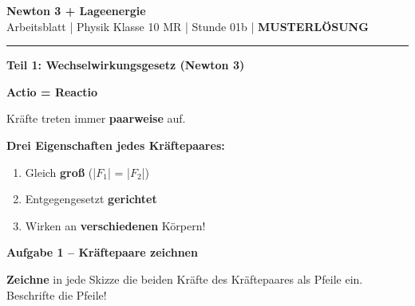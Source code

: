 \documentclass[11pt, a4paper]{article}
\newcommand{\fach}{Physik}
\newcommand{\thema}{Newton 3 + Lageenergie}
\newcommand{\klasse}{10 MR}
\newcommand{\stunde}{01b}
\newcommand{\lsg}[1]{\textcolor{loesung}{\textbf{#1}}}
\newcommand{\aufgabe}[1]{%
    \needspace{4\baselineskip}%
    \vspace{10pt}%
    \noindent\textbf{\textcolor{fachfarbe}{Aufgabe #1}}%
    \vspace{4pt}%
    \nopagebreak[4]%
}
\newcommand{\operator}[1]{\textbf{\textcolor{fachfarbe}{#1}}}
\begin{document}

\begin{center}
    {\Large\bfseries\textcolor{fachfarbe}{\thema}}\\[0.2em]
    {\small Arbeitsblatt | \fach{} Klasse \klasse{} | Stunde \stunde{} | \textcolor{loesung}{\textbf{MUSTERLÖSUNG}}}
\end{center}
\vspace{-0.3em}
\hrule
\vspace{0.6em}


\textbf{\large Teil 1: Wechselwirkungsgesetz (Newton 3)}

\begin{merkkasten}[title={\textbf{Kasten 1: Wechselwirkungsgesetz}}]
\textbf{Actio = Reactio}

Kräfte treten immer \lsg{paarweise} auf.

\vspace{6pt}
\textbf{Drei Eigenschaften jedes Kräftepaares:}
\begin{enumerate}[leftmargin=2em, itemsep=2pt]
    \item Gleich \lsg{groß} (|$F_1$| = |$F_2$|)
    \item Entgegengesetzt \lsg{gerichtet}
    \item Wirken an \lsg{verschiedenen} Körpern!
\end{enumerate}
\end{merkkasten}

\aufgabe{1 – Kräftepaare zeichnen}

\operator{Zeichne} in jede Skizze die beiden Kräfte des Kräftepaares als Pfeile ein. Beschrifte die Pfeile!
\end{document}

